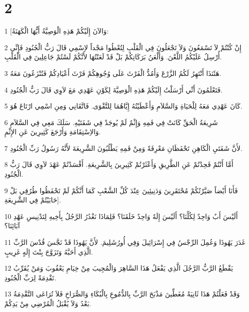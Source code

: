 \chapter{2}

\par 1 [وَالآنَ إِلَيْكُمْ هَذِهِ الْوَصِيَّةُ أَيُّهَا الْكَهَنَةُ:
\par 2 إِنْ كُنْتُمْ لاَ تَسْمَعُونَ وَلاَ تَجْعَلُونَ فِي الْقَلْبِ لِتُعْطُوا مَجْداً لاِسْمِي قَالَ رَبُّ الْجُنُودِ فَإِنِّي أُرْسِلُ عَلَيْكُمُ اللَّعْنَ. وَأَلْعَنُ بَرَكَاتِكُمْ بَلْ قَدْ لَعَنْتُهَا لأَنَّكُمْ لَسْتُمْ جَاعِلِينَ فِي الْقَلْبِ.
\par 3 هَئَنَذَا أَنْتَهِرُ لَكُمُ الزَّرْعَ وَأَمُدُّ الْفَرْثَ عَلَى وُجُوهِكُمْ فَرْثَ أَعْيَادِكُمْ فَتُنْزَعُونَ مَعَهُ.
\par 4 فَتَعْلَمُونَ أَنِّي أَرْسَلْتُ إِلَيْكُمْ هَذِهِ الْوَصِيَّةَ لِكَوْنِ عَهْدِي مَعَ لاَوِي قَالَ رَبُّ الْجُنُودِ.
\par 5 كَانَ عَهْدِي مَعَهُ لِلْحَيَاةِ وَالسَّلاَمِ وَأَعْطَيْتُهُ إِيَّاهُمَا لِلتَّقْوَى. فَاتَّقَانِي وَمِنِ اسْمِي ارْتَاعَ هُوَ.
\par 6 شَرِيعَةُ الْحَقِّ كَانَتْ فِي فَمِهِ وَإِثْمٌ لَمْ يُوجَدْ فِي شَفَتَيْهِ. سَلَكَ مَعِي فِي السَّلاَمِ وَالاِسْتِقَامَةِ وَأَرْجَعَ كَثِيرِينَ عَنِ الإِثْمِ.
\par 7 لأَنَّ شَفَتَيِ الْكَاهِنِ تَحْفَظَانِ مَعْرِفَةً وَمِنْ فَمِهِ يَطْلُبُونَ الشَّرِيعَةَ لأَنَّهُ رَسُولُ رَبِّ الْجُنُودِ.
\par 8 أَمَّا أَنْتُمْ فَحِدْتُمْ عَنِ الطَّرِيقِ وَأَعْثَرْتُمْ كَثِيرِينَ بِالشَّرِيعَةِ. أَفْسَدْتُمْ عَهْدَ لاَوِي قَالَ رَبُّ الْجُنُودِ.
\par 9 فَأَنَا أَيْضاً صَيَّرْتُكُمْ مُحْتَقَرِينَ وَدَنِيئِينَ عِنْدَ كُلِّ الشَّعْبِ كَمَا أَنَّكُمْ لَمْ تَحْفَظُوا طُرُقِي بَلْ حَابَيْتُمْ فِي الشَّرِيعَةِ].
\par 10 أَلَيْسَ أَبٌ وَاحِدٌ لِكُلِّنَا؟ أَلَيْسَ إِلَهٌ وَاحِدٌ خَلَقَنَا؟ فَلِمَاذَا نَغْدُرُ الرَّجُلُ بِأَخِيهِ لِتَدْنِيسِ عَهْدِ آبَائِنَا؟
\par 11 غَدَرَ يَهُوذَا وَعُمِلَ الرِّجْسُ فِي إِسْرَائِيلَ وَفِي أُورُشَلِيمَ. لأَنَّ يَهُوذَا قَدْ نَجَّسَ قُدْسَ الرَّبِّ الَّذِي أَحَبَّهُ وَتَزَوَّجَ بِنْتَ إِلَهٍ غَرِيبٍ.
\par 12 يَقْطَعُ الرَّبُّ الرَّجُلَ الَّذِي يَفْعَلُ هَذَا السَّاهِرَ وَالْمُجِيبَ مِنْ خِيَامِ يَعْقُوبَ وَمَنْ يُقَرِّبُ تَقْدِمَةً لِرَبِّ الْجُنُودِ.
\par 13 وَقَدْ فَعَلْتُمْ هَذَا ثَانِيَةً مُغَطِّينَ مَذْبَحَ الرَّبِّ بِالدُّمُوعِ بِالْبُكَاءِ وَالصُّرَاخِ فَلاَ تُرَاعَى التَّقْدِمَةُ بَعْدُ وَلاَ يُقْبَلُ الْمُرْضِي مِنْ يَدِكُمْ.
